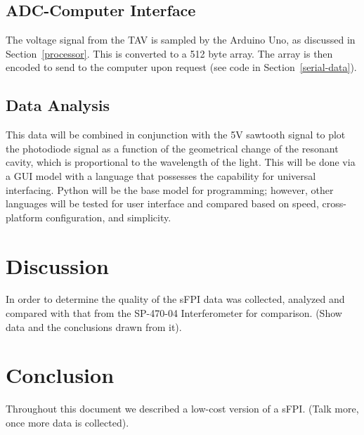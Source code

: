 \documentclass[12pt,journal]{IEEEtran}
\begin{document}
\subsection{ADC-Computer Interface}
The voltage signal from the TAV is sampled by the Arduino Uno, as discussed in Section~\ref{processor}. This is converted to a 512 byte array. The array is then encoded to send to the computer upon request (see code in Section~\ref{serial-data}).

\subsection{Data Analysis}

This data will be combined in conjunction with the 5V sawtooth signal to plot the photodiode signal as a function of the geometrical change of the resonant cavity, which is proportional to the wavelength of the light. This will be done via a GUI model with a language that possesses the capability for universal interfacing. Python will be the base model for programming; however, other languages will be tested for user interface and compared based on speed, cross-platform configuration, and simplicity.

\section{Discussion}
In order to determine the quality of the sFPI data was collected, analyzed and compared with that from the SP-470-04 Interferometer for comparison. (Show data and the conclusions drawn from it).

\section{Conclusion}
Throughout this document we described a low-cost version of a sFPI. (Talk more, once more data is collected).


\end{document}

